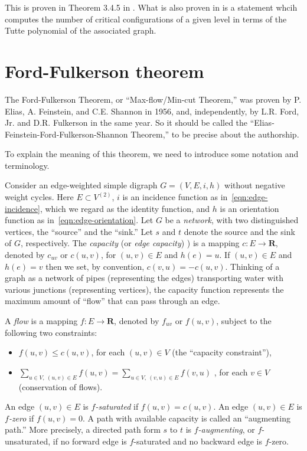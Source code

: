 This is proven in Theorem 3.4.5 in \cite{Morino1999}.
What is also proven in \cite{Morino1999} is a statement
whcih computes the number of critical
configurations of a given level in terms of the
Tutte polynomial of the associated graph.







\section{Ford-Fulkerson theorem}

The Ford-Fulkerson Theorem, or ``Max-flow/Min-cut Theorem,''
was proven by P. Elias, A. Feinstein, and C.E. Shannon in 1956, and,
independently, by L.R. Ford, Jr.  and D.R. Fulkerson in the same year.
So it should be called the
``Elias-Feinstein-Ford-Fulkerson-Shannon Theorem,''
to be precise about the authorship.

To explain the meaning of this theorem, we need to introduce some
notation and  terminology.

Consider an edge-weighted simple
digraph $G=(V,E,i,h)$ without negative weight
cycles. Here $E\subset V^{(2)}$,
$i$ is an incidence function as in~\eqref{eqn:edge-incidence}, which
we regard as the identity function, and $h$ is an
orientation function as in~\eqref{eqn:edge-orientation}.
Let $G$ be a {\it network},
with two distinguished vertices, the ``source'' and the ``sink.''
Let $s$ and $t$ denote the source and the sink of $G$, respectively.
The {\it capacity} (or {\it edge capacity})
)
is a mapping $c: E \to {\mathbf{R}}$, denoted by $c_{uv}$
or $c(u,v)$, for $(u,v)\in E$ and $h(e)= u$.
If $(u,v)\in E$ and $h(e)= v$
then we set, by convention, $c(v,u)=-c(u,v)$.
Thinking of a graph as a network of pipes (representing the edges)
transporting water with various junctions (representing vertices),
the capacity function represents the maximum amount
of ``flow'' that can pass through an edge.

A {\it flow}
is a mapping $f: E \to {\mathbf{R}}$, denoted by $f_{uv}$ or
$f(u,v)$, subject to the following two constraints:
\begin{itemize}
\item
$f(u,v)\leq c(u,v)$, for each $(u,v) \in V$ (the ``capacity constraint''),
\item
$\sum_{u\in V,\ (u,v)\in E} f(u,v) = \sum_{u\in V,\ (v, u)\in E} f(v, u)$ ,
for each $v\in V$ (conservation of flows).
\end{itemize}
An edge $(u,v) \in E$ is {\it $f$-saturated}
if $f(u,v)=c(u,v)$.
An edge $(u,v) \in E$ is {\it $f$-zero} if $f(u,v)=0$.
A path with available capacity is called an ``augmenting path.''
More precisely, a directed path form $s$ to $t$ is
{\it $f$-augmenting}, or
$f$-unsaturated, if no forward
edge is $f$-saturated and no backward edge is $f$-zero.


